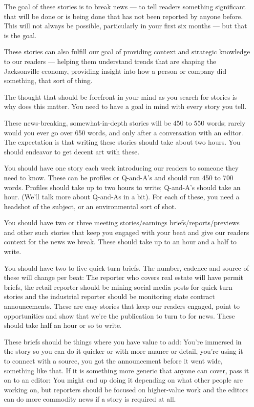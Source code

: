 \documentclass[
  11pt,
  american,
  letterpaperpaper,
  extrafontsizes,onecolumn,openright
  ]{memoir}
\begin{document}
The goal of these stories is to break news --- to tell readers something significant that will be done or is being done that has not been reported by anyone before. This will not always be possible, particularly in your first six months --- but that is the goal.

These stories can also fulfill our goal of providing context and strategic knowledge to our readers --- helping them understand trends that are shaping the Jacksonville economy, providing insight into how a person or company did something, that sort of thing.

The thought that should be forefront in your mind as you search for stories is why does this matter. You need to have a goal in mind with every story you tell.

These news-breaking, somewhat-in-depth stories will be 450 to 550 words; rarely would you ever go over 650 words, and only after a conversation with an editor. The expectation is that writing these stories should take about two hours. You should endeavor to get decent art with these.

You should have one story each week introducing our readers to someone they need to know. These can be profiles or Q-and-A's and should run 450 to 700 words. Profiles should take up to two hours to write; Q-and-A's should take an hour. (We'll talk more about Q-and-As in a bit). For each of these, you need a headshot of the subject, or an environmental sort of shot.

You should have two or three meeting stories/earnings briefs/reports/previews and other such stories that keep you engaged with your beat and give our readers context for the news we break. These should take up to an hour and a half to write.

You should have two to five quick-turn briefs. The number, cadence and source of these will change per beat: The reporter who covers real estate will have permit briefs, the retail reporter should be mining social media posts for quick turn stories and the industrial reporter should be monitoring state contract announcements. These are easy stories that keep our readers engaged, point to opportunities and show that we're the publication to turn to for news. These should take half an hour or so to write.

These briefs should be things where you have value to add: You're immersed in the story so you can do it quicker or with more nuance or detail, you're using it to connect with a source, you got the announcement before it went wide, something like that. If it is something more generic that anyone can cover, pass it on to an editor: You might end up doing it depending on what other people are working on, but reporters should be focused on higher-value work and the editors can do more commodity news if a story is required at all.
\end{document}
